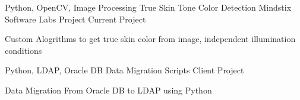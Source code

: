 

\begin{cventries}


  \cventry
    {Python, OpenCV, Image Processing} %
    {True Skin Tone Color Detection} %
    {Mindstix Software Labs Project} %
    {Current Project} %
    {
      \begin{cvitems} %
        \item {Custom Alogrithms to get true skin color from image, independent illumination conditions}
      \end{cvitems}
    }
  \cventry
    {Python, LDAP, Oracle DB} %
    {Data Migration Scripts} %
    {Client Project} %
    {} %
    {
      \begin{cvitems} %
        \item {Data Migration From Oracle DB to LDAP using Python}
      \end{cvitems}
    }


\end{cventries}
